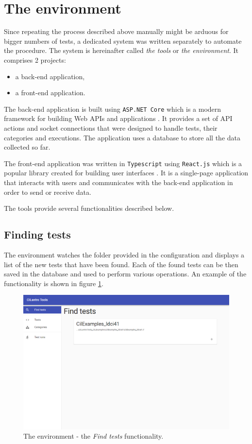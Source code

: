 \documentclass[declaration,shortabstract,english,mgr]{iithesis}
\begin{document}
\section{The environment}

Since repeating the process described above manually might be arduous for bigger numbers of tests, a dedicated system was written separately to automate the procedure. The system is hereinafter called \textit{the tools} or \textit{the environment}. It comprises 2 projects:
\begin{itemize}
	\item{a back-end application,}
	\item{a front-end application.}
\end{itemize}

The back-end application is built using \texttt{ASP.NET Core} which is a modern framework for building Web APIs and applications \cite{littleAsp}. It provides a set of API actions and socket connections that were designed to handle tests, their categories and executions. The application uses a database to store all the data collected so far.

The front-end application was written in \texttt{Typescript} using \texttt{React.js} which is a popular library created for building user interfaces \cite{learningReact}. It is a single-page application that interacts with users and communicates with the back-end application in order to send or receive data.

The tools provide several functionalities described below.

\subsection{Finding tests}

The environment watches the folder provided in the configuration and displays a list of the new tests that have been found. Each of the found tests can be then saved in the database and used to perform various operations. An example of the functionality is shown in figure \ref{fig:tools_find}.

\begin{figure}
	\includegraphics[width=1\textwidth]{tools_find.png}
    \centering
    \caption{The environment - the \textit{Find tests} functionality.}
    \label{fig:tools_find}
\end{figure}
\end{document}
